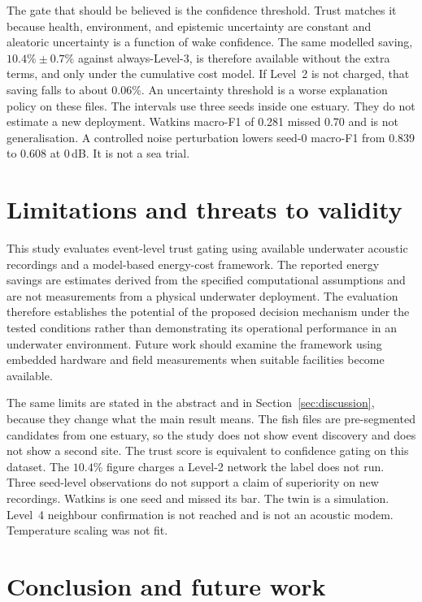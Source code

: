 \documentclass[sn-mathphys-num]{sn-jnl}%
\theoremstyle{thmstyleone}%
\theoremstyle{thmstyletwo}%
\theoremstyle{thmstylethree}%
\begin{document}
The gate that should be believed is the confidence threshold. Trust matches it because health, environment, and epistemic uncertainty are constant and aleatoric uncertainty is a function of wake confidence. The same modelled saving, $10.4\% \pm 0.7\%$ against always-Level-3, is therefore available without the extra terms, and only under the cumulative cost model. If Level~2 is not charged, that saving falls to about $0.06\%$. An uncertainty threshold is a worse explanation policy on these files. The intervals use three seeds inside one estuary. They do not estimate a new deployment. Watkins macro-F1 of 0.281 missed 0.70 and is not generalisation. A controlled noise perturbation lowers seed-0 macro-F1 from 0.839 to 0.608 at 0\,dB. It is not a sea trial.

\section{Limitations and threats to validity}\label{sec:limits}

This study evaluates event-level trust gating using available underwater acoustic recordings and a model-based energy-cost framework. The reported energy savings are estimates derived from the specified computational assumptions and are not measurements from a physical underwater deployment. The evaluation therefore establishes the potential of the proposed decision mechanism under the tested conditions rather than demonstrating its operational performance in an underwater environment. Future work should examine the framework using embedded hardware and field measurements when suitable facilities become available.

The same limits are stated in the abstract and in Section~\ref{sec:discussion}, because they change what the main result means. The fish files are pre-segmented candidates from one estuary, so the study does not show event discovery and does not show a second site. The trust score is equivalent to confidence gating on this dataset. The $10.4\%$ figure charges a Level-2 network the label does not run. Three seed-level observations do not support a claim of superiority on new recordings. Watkins is one seed and missed its bar. The twin is a simulation. Level~4 neighbour confirmation is not reached and is not an acoustic modem. Temperature scaling was not fit.

\section{Conclusion and future work}\label{sec:conclusion}
\end{document}
